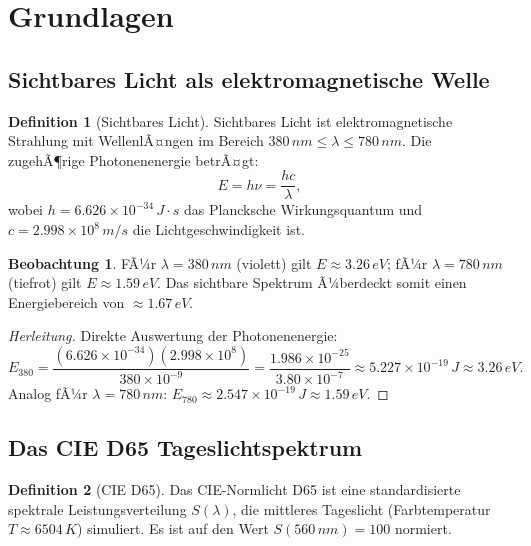 ﻿\documentclass[a4paper,12pt]{article}
\theoremstyle{definition}
\newtheorem{definition}{Definition}
\newtheorem{beobachtung}{Beobachtung}
\begin{document}
\section{Grundlagen}

\subsection{Sichtbares Licht als elektromagnetische Welle}

\begin{definition}[Sichtbares Licht]
Sichtbares Licht ist elektromagnetische Strahlung mit WellenlÃ¤ngen im Bereich
$380\,\si{nm} \le \lambda \le 780\,\si{nm}$. Die zugehÃ¶rige Photonenenergie betrÃ¤gt:
\[
  E = h\nu = \frac{hc}{\lambda},
\]
wobei $h = 6.626 \times 10^{-34}\,\si{J\cdot s}$ das Plancksche Wirkungsquantum und
$c = 2.998 \times 10^8\,\si{m/s}$ die Lichtgeschwindigkeit ist.
\end{definition}

\begin{beobachtung}
FÃ¼r $\lambda = 380\,\si{nm}$ (violett) gilt $E \approx 3.26\,\si{eV}$;
fÃ¼r $\lambda = 780\,\si{nm}$ (tiefrot) gilt $E \approx 1.59\,\si{eV}$.
Das sichtbare Spektrum Ã¼berdeckt somit einen Energiebereich von $\approx 1.67\,\si{eV}$.
\end{beobachtung}

\begin{proof}[Herleitung]
Direkte Auswertung der Photonenenergie:
\[
  E_{380} = \frac{(6.626\times10^{-34})(2.998\times10^8)}{380\times10^{-9}}
           = \frac{1.986\times10^{-25}}{3.80\times10^{-7}}
           \approx 5.227\times10^{-19}\,\si{J}
           \approx 3.26\,\si{eV}.
\]
Analog fÃ¼r $\lambda = 780\,\si{nm}$:
$E_{780} \approx 2.547\times10^{-19}\,\si{J} \approx 1.59\,\si{eV}$.
\end{proof}

\subsection{Das CIE D65 Tageslichtspektrum}

\begin{definition}[CIE D65]
Das CIE-Normlicht D65 ist eine standardisierte spektrale Leistungsverteilung $S(\lambda)$,
die mittleres Tageslicht (Farbtemperatur $T \approx 6504\,\si{K}$) simuliert.
Es ist auf den Wert $S(560\,\si{nm}) = 100$ normiert.
\end{definition}
\end{document}

